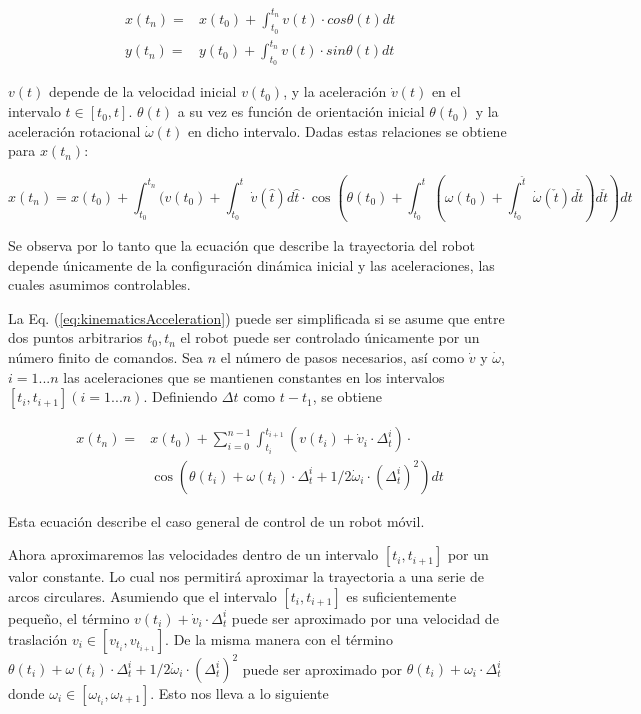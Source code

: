 \documentclass[10pt]{article}
\begin{document}
\begin{align}
	x(t_n) = 
		& x(t_0) + \int_{t_0}^{t_n} v(t) \cdot cos\theta(t) dt
	\\
	y(t_n) = 
		& y(t_0) + \int_{t_0}^{t_n} v(t) \cdot sin\theta(t) dt
\end{align}

$v(t)$ depende de la velocidad inicial $v(t_0)$, y la aceleración $\dot{v}(t)$ en el intervalo $t \in [t_0, t]$. $\theta(t)$ a su vez es función de orientación inicial $\theta(t_0)$ y la aceleración rotacional $\dot{\omega}(t)$ en dicho intervalo. Dadas estas relaciones se obtiene para $x(t_n)$:

\begin{equation}
\label{eq:kinematicsAcceleration}
	x(t_n) = x(t_0) 
		+ \int_{t_0}^{t_n}(v(t_0) + \int_{t_0}^{t} \dot{v}(\hat{t})d\hat{t}
		\cdot \cos (\theta(t_0) + \int_{t_0}^{t}(\omega(t_0) + \int_{t_0}^{\check{t}}\dot{\omega}(\check{t})d\check{t})d\check{t})dt
\end{equation}

Se observa por lo tanto que la ecuación que describe la trayectoria del robot depende únicamente de la configuración dinámica inicial y las aceleraciones, las cuales asumimos controlables. 

La Eq. (\ref{eq:kinematicsAcceleration}) puede ser simplificada si se asume que entre dos puntos arbitrarios $t_0, t_n$ el robot puede ser controlado únicamente por un número finito de comandos. Sea $n$ el número de pasos necesarios, así como $\dot{v}$ y $\dot{\omega}$, $i = 1...n$ las aceleraciones que se mantienen constantes en los intervalos $[t_i, t_{i+1}](i=1...n)$. Definiendo $\Delta t$ como $t - t_1$, se obtiene

\begin{equation}
\label{eq:controlGeneral}
\begin{aligned}
	x(t_n) = &
		x(t_0) + \sum_{i=0}^{n-1} \int_{t_i}^{t_{i+1}} (v(t_i) + \dot{v}_i \cdot \Delta_t^i) \cdot 
		\\ &
		\cos (\theta(t_i) + \omega(t_i)\cdot\Delta_t^i + 1/2 \dot{\omega}_i \cdot (\Delta_t^i)^2) dt
\end{aligned}
\end{equation}

Esta ecuación describe el caso general de control de un robot móvil.

Ahora aproximaremos las velocidades dentro de un intervalo $[t_i, t_{i+1}]$ por un valor constante. Lo cual nos permitirá aproximar la trayectoria a una serie de arcos circulares. Asumiendo que el intervalo $[t_i, t_{i+1}]$ es suficientemente pequeño, el término $v(t_i) + \dot{v}_i \cdot \Delta_t^i$ puede ser aproximado por una velocidad de traslación $v_i \in [v_{t_i}, v_{t_{i+1}}]$. De la misma manera con el término $\theta(t_i) + \omega(t_i)\cdot\Delta_t^i + 1/2 \dot{\omega}_i \cdot (\Delta_t^i)^2$ puede ser aproximado por $ \theta(t_i) + \omega_i \cdot \Delta_t^i $ donde $\omega_i \in [\omega_{t_i}, \omega_{t+1}]$. Esto nos lleva a lo siguiente
\end{document}
